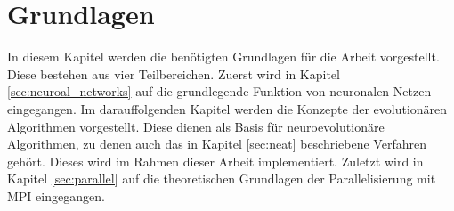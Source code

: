 \chapter{Grundlagen}
\label{chap:basics}
In diesem Kapitel werden die benötigten Grundlagen für die Arbeit vorgestellt. Diese bestehen aus vier Teilbereichen. Zuerst wird in Kapitel \ref{sec:neuroal_networks} auf die grundlegende Funktion von neuronalen Netzen eingegangen. Im darauffolgenden Kapitel werden die Konzepte der evolutionären Algorithmen vorgestellt. Diese dienen als Basis für neuroevolutionäre Algorithmen, zu denen auch das in Kapitel \ref{sec:neat} beschriebene Verfahren gehört. Dieses wird im Rahmen dieser Arbeit implementiert. Zuletzt wird in Kapitel \ref{sec:parallel} auf die theoretischen Grundlagen der Parallelisierung mit \acs*{MPI} eingegangen.





